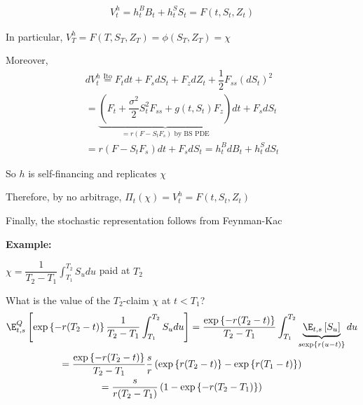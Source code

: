 \par\bigskip
\begin{prf}[]{}
  \begin{equation*}
    \begin{gathered}
      V_t^h = h_t^BB_t+h_t^SS_t = F(t,S_t,Z_t)
    \end{gathered}
  \end{equation*}\par
  \noindent In particular, $V_T^h = F(T,S_T,Z_T) = \phi(S_T,Z_T) = \chi$\par
  \noindent Moreover, 
  \begin{equation*}
    \begin{gathered}
      dV_t^h\stackrel{\text{Ito}}{=} F_tdt+F_sdS_t+F_zdZ_t+\dfrac{1}{2}F_{ss}(dS_t)^2\\
      = \underbrace{\left(F_t+\dfrac{\sigma^2}{2}S_t^2F_{ss}+g(t,S_t)F_z\right)}_{=r(F-S_tF_s)\text{ by BS PDE}}dt+F_sdS_t\\
      = r(F-S_tF_s)dt + F_sdS_t = h_t^BdB_t+h_t^SdS_t
    \end{gathered}
  \end{equation*}\par
  \noindent So $h$ is self-financing and replicates $\chi$\par
  \noindent Therefore, by no arbitrage, $\Pi_t(\chi) = V_t^h = F(t,S_t,Z_t)$\par
  \noindent Finally, the stochastic representation follows from Feynman-Kac
\end{prf}
\par\bigskip
\noindent\textbf{Example:}\par
\noindent $\chi = \dfrac{1}{T_2-T_1}\int_{T_1}^{T_2}S_udu$ paid at $T_2$\par
\noindent What is the value of the $T_2$-claim $\chi$ at $t<T_1$?
\begin{equation*}
  \begin{gathered}
    \E_{t,s}^Q\left[\text{exp}\left\{-r(T_2-t)\right\}\dfrac{1}{T_2-T_1}\int_{T_1}^{T_2}S_udu\right] = \dfrac{\text{exp}\left\{-r(T_2-t)\right\}}{T_2-T_1}\int_{T_1}^{T_2}\underbrace{\E_{t,s}\left[S_u\right]}_{s\text{exp}\left\{r(u-t)\right\}}du\\
    = \dfrac{\text{exp}\left\{-r(T_2-t)\right\}}{T_2-T_1}\dfrac{s}{r}\left(\text{exp}\left\{r(T_2-t)\right\}-\text{exp}\left\{r(T_1-t)\right\}\right)\\
    = \dfrac{s}{r(T_2-T_1)}\left(1-\text{exp}\left\{-r(T_2-T_1)\right\}\right)
  \end{gathered}
\end{equation*}\par
